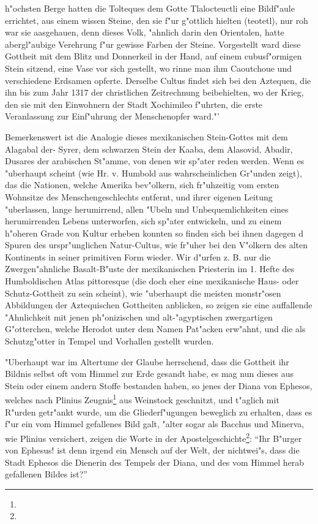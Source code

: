\documentclass[a4paper, 11pt, oneside, polutonikogreek, german]{article}
\begin{document}
h"ochsten Berge hatten die Tolteques dem Gotte Tlalocteuctli eine Bildf"aule errichtet, aus einem wissen Steine, den sie f"ur g"ottlich hielten (teotetl), nur roh war sie aasgehauen, denn dieses Volk, "ahnlich darin den Orientalen, hatte abergl"aubige Verehrung f"ur gewisse Farben der Steine. Vorgestellt ward diese Gottheit mit dem Blitz und Donnerkeil in der Hand, auf einem cubusf"ormigen Stein sitzend, eine Vase vor sich gestellt, wo rinne man ihm Caoutchoue und verschiedene Erdsamen opferte. Derselbe Cultus findet sich bei den Aztequen, die ihn bis zum Jahr 1317 der christlichen Zeitrechnung beibehielten, wo der Krieg, den sie mit den Einwohnern der Stadt Xochimileo f"uhrten, die erste Veranlassung zur Einf"uhrung der Menschenopfer ward."'

Bemerkenswert ist die Analogie dieses mexikanischen Stein-Gottes mit dem Alagabal der- Syrer, dem schwarzen Stein der Kaaba, dem Alasovid, Abadir, Dusares der arabischen St"amme, von denen wir sp"ater reden werden. Wenn es "uberhaupt scheint (wie Hr. v. Humbold aus wahrscheinlichen Gr"unden zeigt), das die Nationen, welche Amerika bev"olkern, sich fr"uhzeitig vom ersten Wohnsitze des Menschengeschlechts entfernt, und ihrer eigenen Leitung "uberlassen, lange herumirrend, allen "Ubeln und Unbequemlichkeiten eines herumirrenden Lebens unterworfen, sich sp"ater entwickeln, und zu einem h"oheren Grade von Kultur erheben konnten so finden sich bei ihnen dagegen d Spuren des urspr"unglichen Natur-Cultus, wie fr"uher bei den V"olkern des alten Kontinents in seiner primitiven Form wieder. Wir d"urfen z. B. nur die Zwergen"ahnliche Basalt-B"uste der mexikanischen Priesterin im 1. Hefte des Humboldischen Atlas pittoresque (die doch eher eine mexikanische Haus- oder Schutz-Gottheit zu sein scheint), wie "uberhaupt die meisten monstr"osen Abbildungen der Aztequischen Gottheiten anblicken, so zeigen sie eine auffallende "Ahnlichkeit mit jenen ph"onizischen und alt-"agyptischen zwergartigen G"otterchen, welche Herodot unter dem Namen Pat"acken erw"ahnt, und die als Schutzg"otter in Tempel und Vorhallen gestellt wurden.

"Uberhaupt war im Altertume der Glaube herrschend, dass die Gottheit ihr Bildnis selbst oft vom Himmel zur Erde gesandt habe, es mag nun dieses aus Stein oder einem andern Stoffe bestanden haben, so jenes der Diana von Ephesos, welches nach Plinius Zeugnis\footnote{} aus Weinstock geschnitzt, und t"aglich mit R"urden getr"ankt wurde, um die Gliederf"ugungen beweglich zu erhalten, dass es f"ur ein vom Himmel gefallenes Bild galt, "alter sogar als Bacchus und Minerva, wie Plinius versichert, zeigen die Worte in der Apostelgeschichte\footnote{}: "`Ihr B"urger von Ephesus! ist denn irgend ein Mensch auf der Welt, der nichtwei"s, dass die Stadt Ephesos die Dienerin des Tempels der Diana, und des vom Himmel herab gefallenen Bildes ist?"'
\end{document}
